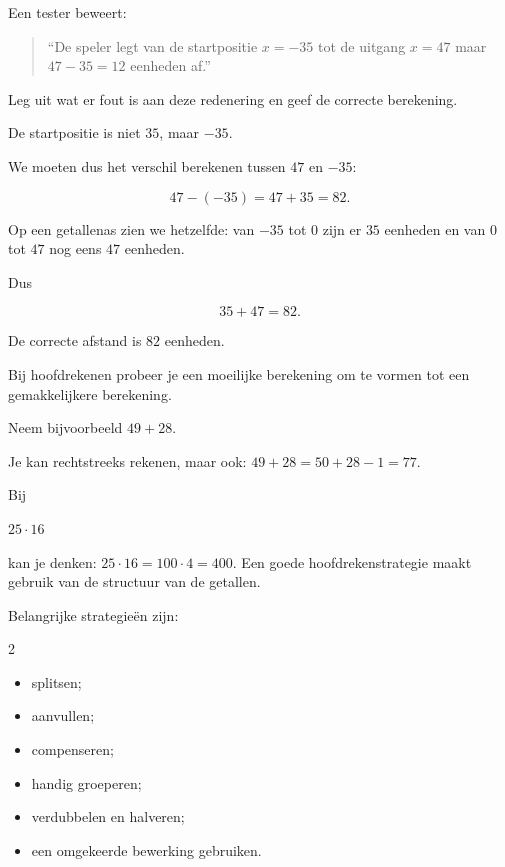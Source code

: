\documentclass{ximera}
\begin{document}
\begin{oefening}[De metrotunnel]{\oefG\ESS}
\begin{question}
        Een tester beweert:
        
        \begin{quote}
        ``De speler legt van de startpositie \(x=-35\) tot de uitgang \(x=47\)
        maar \(47-35=12\) eenheden af.''
        \end{quote}
        
        Leg uit wat er fout is aan deze redenering en geef de correcte berekening.
        
        \begin{oplossing}
        
        De startpositie is niet \(35\), maar \(-35\).
        
        We moeten dus het verschil berekenen tussen \(47\) en \(-35\):
        
        \[
        47-(-35)=47+35=82.
        \]
        
        Op een getallenas zien we hetzelfde: van \(-35\) tot \(0\) zijn er
        \(35\) eenheden en van \(0\) tot \(47\) nog eens \(47\) eenheden.
        
        Dus
        
        \[
        35+47=82.
        \]
        
        De correcte afstand is \(82\) eenheden.
        
        \end{oplossing}
        
        \end{question}
        
        \end{oefening}




Bij hoofdrekenen probeer je een moeilijke berekening om te vormen tot een
gemakkelijkere berekening.

Neem bijvoorbeeld \(
49+28.
\)

Je kan rechtstreeks rekenen, maar ook:
\(
49+28
=
50+28-1
=
77.
\)

Bij

\(
25\cdot16
\)

kan je denken:
\(
25\cdot16
=
100\cdot4
=
400.
\)
Een goede hoofdrekenstrategie maakt gebruik van de structuur van de getallen.

Belangrijke strategieën zijn:
\begin{multicols}{2}
    \begin{itemize}
    \item splitsen;
    \item aanvullen;
    \item compenseren;
    \item handig groeperen;
    \item verdubbelen en halveren;
    \item een omgekeerde bewerking gebruiken.
\end{itemize}
\end{multicols}
\end{document}

